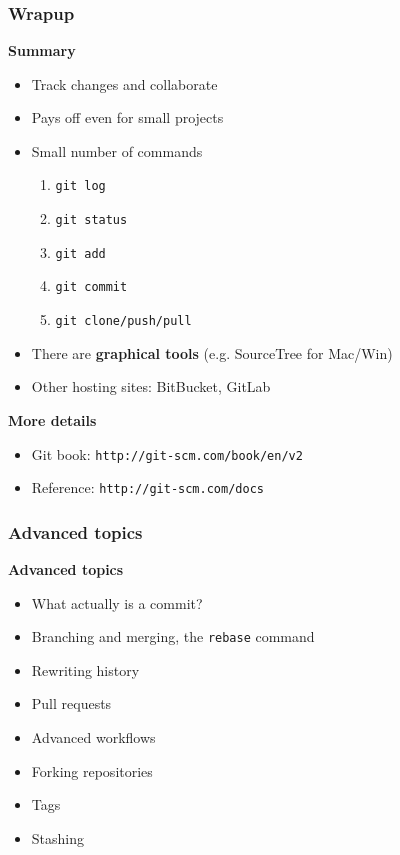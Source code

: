 \documentclass{beamer}
\begin{document}

\begin{frame}
  \frametitle{${}^{}$}
\end{frame}


\begin{frame}
  \frametitle{Wrapup}
  \textbf{\Large Summary}
  \begin{itemize}
    \item Track changes and collaborate
    \item Pays off even for small projects
    \item Small number of commands
      \begin{enumerate}
        \item \texttt{git log}
        \item \texttt{git status}
        \item \texttt{git add}
        \item \texttt{git commit}
        \item \texttt{git clone/push/pull}
      \end{enumerate}
    \item There are \textbf{graphical tools} (e.g. SourceTree for Mac/Win)
    \item Other hosting sites: BitBucket, GitLab
  \end{itemize}
  \textbf{\Large More details}
  \begin{itemize}
  \item Git book: \texttt{http://git-scm.com/book/en/v2}
  \item Reference: \texttt{http://git-scm.com/docs}
  \end{itemize}
\end{frame}


\begin{frame}
  \frametitle{Advanced topics}
  \textbf{\Large Advanced topics}
  \begin{itemize}
    \item What actually is a commit?
    \item Branching and merging, the \texttt{rebase} command
    \item Rewriting history
    \item Pull requests
    \item Advanced workflows
    \item Forking repositories
    \item Tags
    \item Stashing
  \end{itemize}
\end{frame}
\end{document}
